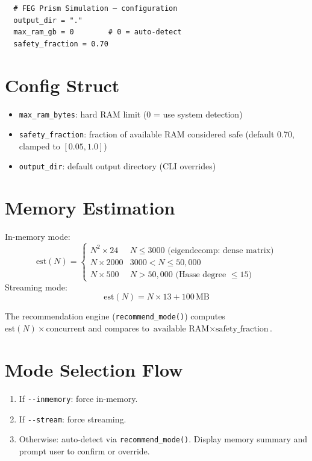 \documentclass[11pt, a4paper, openany]{book}
\newcommand{\code}[1]{\texttt{#1}}
\newcommand{\func}[1]{\texttt{\color{structure}#1}}
\newcommand{\flag}[1]{\texttt{-{}-#1}}
\begin{document}
\begin{verbatim}
  # FEG Prism Simulation — configuration
  output_dir = "."
  max_ram_gb = 0        # 0 = auto-detect
  safety_fraction = 0.70
\end{verbatim}

\section{Config Struct}

\begin{definition}
  \begin{itemize}
    \item \code{max\_ram\_bytes}: hard RAM limit (0 = use system detection)
    \item \code{safety\_fraction}: fraction of available RAM considered safe
          (default 0.70, clamped to $[0.05, 1.0]$)
    \item \code{output\_dir}: default output directory (CLI overrides)
  \end{itemize}
\end{definition}

\section{Memory Estimation}

\begin{definition}
  In-memory mode:
  \[
    \text{est}(N) = \begin{cases}
      N^2 \times 24  & N \leq 3000 \text{ (eigendecomp: dense matrix)} \\
      N \times 2000  & 3000 < N \leq 50{,}000 \\
      N \times 500   & N > 50{,}000 \text{ (Hasse degree $\leq 15$)}
    \end{cases}
  \]
  Streaming mode:
  \[
    \text{est}(N) = N \times 13 + 100\,\text{MB}
  \]
\end{definition}

The recommendation engine (\func{recommend\_mode()}) computes
$\text{est}(N) \times \text{concurrent}$ and compares to
$\text{available RAM} \times \text{safety\_fraction}$.

\section{Mode Selection Flow}

\begin{enumerate}
  \item If \flag{inmemory}: force in-memory.
  \item If \flag{stream}: force streaming.
  \item Otherwise: auto-detect via \func{recommend\_mode()}.  Display memory
        summary and prompt user to confirm or override.
\end{enumerate}
\end{document}
